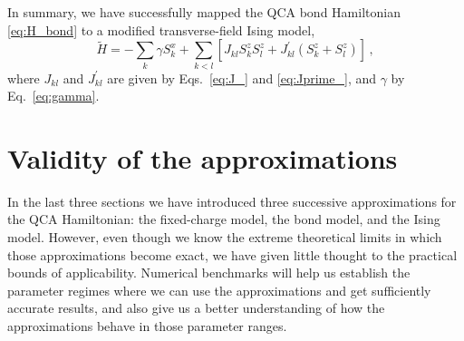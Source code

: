 In summary, we have successfully mapped the QCA bond
Hamiltonian \eqref{eq:H_bond} to a modified transverse-field Ising model,
\begin{equation}
  \label{eq:H_Ising}
  \tilde{H}
  =
  - \sum_k \gamma S^x_k
  + \sum_{k<l}
    \left[
      J_{kl} S^z_k S^z_l + 
      J^{\prime}_{kl} \left( S^z_k + S^z_l \right)
    \right] \, ,
\end{equation}
where $J_{kl}$ and $J^{\prime}_{kl}$ are given by Eqs.~\eqref{eq:J_} and
\eqref{eq:Jprime_}, and $\gamma$ by Eq.~\eqref{eq:gamma}.

\clearpage


\section{Validity of the approximations}
\label{sec:validity_of_the_approximations}

In the last three sections we have introduced three successive approximations
for the QCA Hamiltonian: the fixed-charge model, the bond model, and the Ising
model. However, even though we know the extreme theoretical limits in which
those approximations become exact, we have given little thought to the practical
bounds of applicability. Numerical benchmarks will help us establish the
parameter regimes where we can use the approximations and get sufficiently
accurate results, and also give us a better understanding of how the
approximations behave in those parameter ranges.

